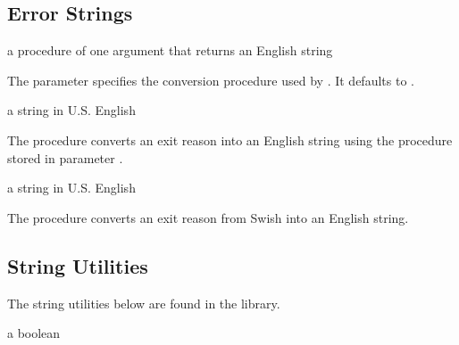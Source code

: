 \subsection{Error Strings}

\begin{parameter}
\end{parameter}
\hasvalue{} a procedure of one argument that returns an English string

The  parameter specifies the
conversion procedure used by . It defaults
to .

\begin{procedure}
\end{procedure}
\returns{} a string in U.S. English

The  procedure converts an exit reason into
an English string using the procedure stored in parameter
.

\begin{procedure}
\end{procedure}
\returns{} a string in U.S. English

The  procedure converts an exit
reason from Swish into an English string.

\subsection{String Utilities}

The string utilities below are found in the  library.

\begin{procedure}
\end{procedure}
\returns{} a boolean

